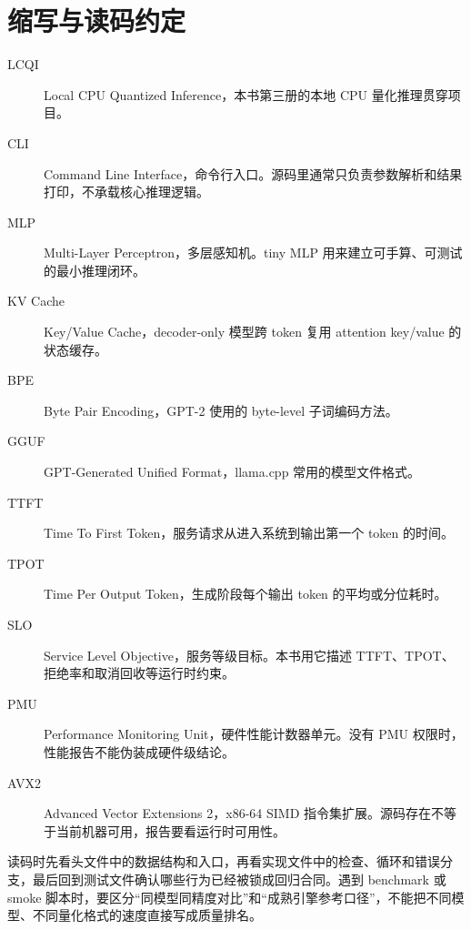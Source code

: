 \chapter*{缩写与读码约定}

\begin{description}
  \item[LCQI] Local CPU Quantized Inference，本书第三册的本地 CPU 量化推理贯穿项目。
  \item[CLI] Command Line Interface，命令行入口。源码里通常只负责参数解析和结果打印，不承载核心推理逻辑。
  \item[MLP] Multi-Layer Perceptron，多层感知机。tiny MLP 用来建立可手算、可测试的最小推理闭环。
  \item[KV Cache] Key/Value Cache，decoder-only 模型跨 token 复用 attention key/value 的状态缓存。
  \item[BPE] Byte Pair Encoding，GPT-2 使用的 byte-level 子词编码方法。
  \item[GGUF] GPT-Generated Unified Format，llama.cpp 常用的模型文件格式。
  \item[TTFT] Time To First Token，服务请求从进入系统到输出第一个 token 的时间。
  \item[TPOT] Time Per Output Token，生成阶段每个输出 token 的平均或分位耗时。
  \item[SLO] Service Level Objective，服务等级目标。本书用它描述 TTFT、TPOT、拒绝率和取消回收等运行时约束。
  \item[PMU] Performance Monitoring Unit，硬件性能计数器单元。没有 PMU 权限时，性能报告不能伪装成硬件级结论。
  \item[AVX2] Advanced Vector Extensions 2，x86-64 SIMD 指令集扩展。源码存在不等于当前机器可用，报告要看运行时可用性。
\end{description}

读码时先看头文件中的数据结构和入口，再看实现文件中的检查、循环和错误分支，最后回到测试文件确认哪些行为已经被锁成回归合同。遇到 benchmark 或 smoke 脚本时，要区分“同模型同精度对比”和“成熟引擎参考口径”，不能把不同模型、不同量化格式的速度直接写成质量排名。
